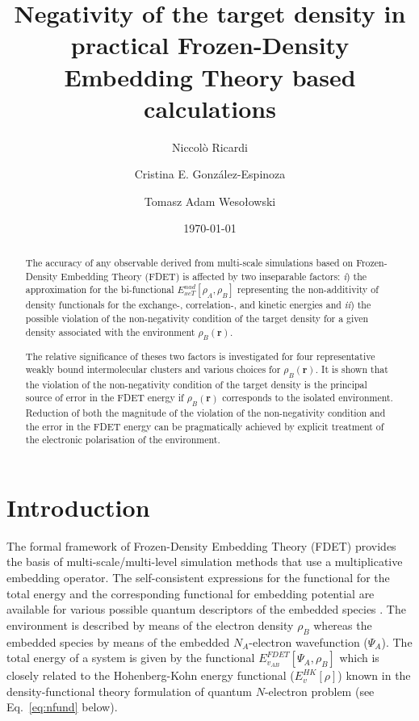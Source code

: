 \documentclass[amsmath,amssymb,preprint,aip,jcp]{revtex4-1}
\begin{document}
\author{Niccol\`{o} Ricardi}
\author{Cristina E. Gonz\'{a}lez-Espinoza}
\author{Tomasz Adam Weso\l{}owski}
% 
\date{\today}
\title{Negativity of the target density in practical Frozen-Density Embedding Theory based calculations}

\begin{abstract}
The accuracy of any observable derived from multi-scale simulations based on Frozen-Density Embedding Theory (FDET) is affected by two inseparable factors: {\it i}) the approximation for the bi-functional ${E}_{xcT}^{nad}[\rho_A,\rho_B]$ representing the non-additivity of density functionals for the exchange-, correlation-, and kinetic energies and {\it ii}) the possible violation of the non-negativity condition of the target density for a given density associated with the environment $\rho_B(\mathbf{r})$.

The relative significance of theses two factors is investigated for four representative weakly bound intermolecular clusters and various choices for $\rho_B(\mathbf{r})$.
It is shown that the violation of the non-negativity condition of the target density is the principal source of error in the FDET energy
if $\rho_B(\mathbf{r})$ corresponds to the isolated environment.
Reduction of both the magnitude of the violation of the non-negativity condition and the error in the FDET energy can be pragmatically achieved by explicit treatment of the electronic polarisation of the environment.
\end{abstract}

\maketitle

\section{Introduction}\label{sec:intro}
The formal framework of 
Frozen-Density Embedding Theory (FDET) provides the basis of multi-scale/multi-level simulation methods that use a multiplicative embedding operator. The self-consistent expressions for the functional for the total energy and the corresponding functional for embedding potential are available for various possible quantum descriptors of the embedded species \cite{Wesolowski1993,Wesolowski2008,Pernal2009,Wesolowski2015,Wesolowski2020}. 
The environment is described by means of the electron density $\rho_B$ whereas the embedded species by means of the 
embedded $N_A$-electron wavefunction ($\Psi_A$). The total energy of a system is given by the functional ${E}_{v_{AB}}^{FDET}[\Psi_{A},\rho_B]$ which is closely related to the Hohenberg-Kohn energy functional ($E_v^{HK}[\rho]$) known in the density-functional theory \cite{Hohenberg1964} formulation of quantum $N$-electron problem (see Eq.~\ref{eq:nfund} below).
\end{document}
